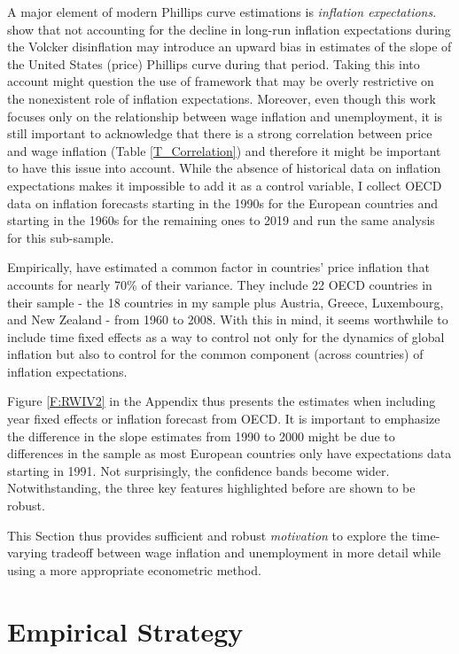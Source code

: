 \documentclass[12pt]{article}
\begin{document}
A major element of modern Phillips curve estimations is \textit{inflation expectations}. \cite{Hazell2021} show that not accounting for the decline in long-run inflation expectations during the Volcker disinflation may introduce an upward bias in estimates of the slope of the United States (price) Phillips curve during that period. Taking this into account might question the use of \cite{Gali2011} framework that may be overly restrictive on the nonexistent role of inflation expectations. Moreover, even though this work focuses only on the relationship between wage inflation and unemployment, it is still important to acknowledge that there is a strong correlation between price and wage inflation (Table \ref{T_Correlation}) and therefore it might be important to have this issue into account. While the absence of historical data on inflation expectations makes it impossible to add it as a control variable, I collect OECD data on inflation forecasts starting in the 1990s for the European countries and starting in the 1960s for the remaining ones to 2019 and run the same analysis for this sub-sample.

Empirically, \cite{Ciccarelli2010} have estimated a common factor in countries' price inflation that accounts for nearly 70\% of their variance. They include 22 OECD countries in their sample - the 18 countries in my sample plus Austria, Greece, Luxembourg, and New Zealand - from 1960 to 2008. With this in mind, it seems worthwhile to include time fixed effects as a way to control not only for the dynamics of global inflation but also to control for the common component (across countries) of inflation expectations.

Figure \ref{F:RWIV2} in the Appendix thus presents the estimates when including year fixed effects or inflation forecast from OECD. It is important to emphasize the difference in the slope estimates from 1990 to 2000 might be due to differences in the sample as most European countries only have expectations data starting in 1991. Not surprisingly, the confidence bands become wider. Notwithstanding, the three key features highlighted before are shown to be robust.

This Section thus provides sufficient and robust \textit{motivation} to explore the time-varying tradeoff between wage inflation and unemployment in more detail while using a more appropriate econometric method.


\section{Empirical Strategy \label{SS_Identification}}
\end{document}
